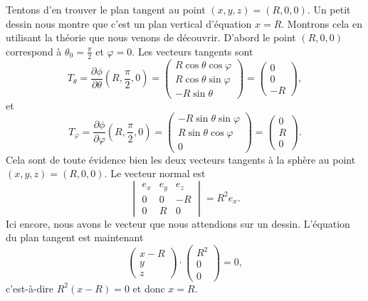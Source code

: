 \begin{example}
	Tentons d'en trouver le plan tangent au point \( (x,y,z)=(R,0,0)\). Un petit dessin nous montre que c'est un plan vertical d'équation \( x=R\). Montrons cela en utilisant la théorie que nous venons de découvrir. D'abord le point \( (R,0,0)\) correspond à \( \theta_0=\frac{ \pi }{ 2 }\) et \( \varphi=0\). Les vecteurs tangents sont
	\begin{equation}        \label{EqTthetaSph}
		T_{\theta}=\frac{ \partial \phi }{ \partial \theta }(R,\frac{ \pi }{2},0)=\begin{pmatrix}
			R\cos\theta\cos\varphi \\
			R\cos\theta\sin\varphi \\
			-R\sin\theta
		\end{pmatrix}=\begin{pmatrix}
			0 \\
			0 \\
			-R
		\end{pmatrix},
	\end{equation}
	et
	\begin{equation}    \label{EqTvarphiSph}
		T_{\varphi}=\frac{ \partial \phi }{ \partial \varphi }(R,\frac{ \pi }{2},0)=\begin{pmatrix}
			-R\sin\theta\sin\varphi \\
			R\sin\theta\cos\varphi  \\
			0
		\end{pmatrix}=\begin{pmatrix}
			0 \\
			R \\
			0
		\end{pmatrix}.
	\end{equation}
	Cela sont de toute évidence bien les deux vecteurs tangents à la sphère au point \( (x,y,z)=(R,0,0)\). Le vecteur normal est
	\begin{equation}
		\begin{vmatrix}
			e_x & e_y & e_z \\
			0   & 0   & -R  \\
			0   & R   & 0
		\end{vmatrix}=R^2e_x.
	\end{equation}
	Ici encore, nous avons le vecteur que nous attendions sur un dessin. L'équation du plan tangent est maintenant
	\begin{equation}
		\begin{pmatrix}
			x-R \\
			y   \\
			z
		\end{pmatrix}\cdot
		\begin{pmatrix}
			R^2 \\
			0   \\
			0
		\end{pmatrix}=0,
	\end{equation}
	c'est-à-dire \( R^2(x-R)=0\) et donc \( x=R\).
\end{example}


